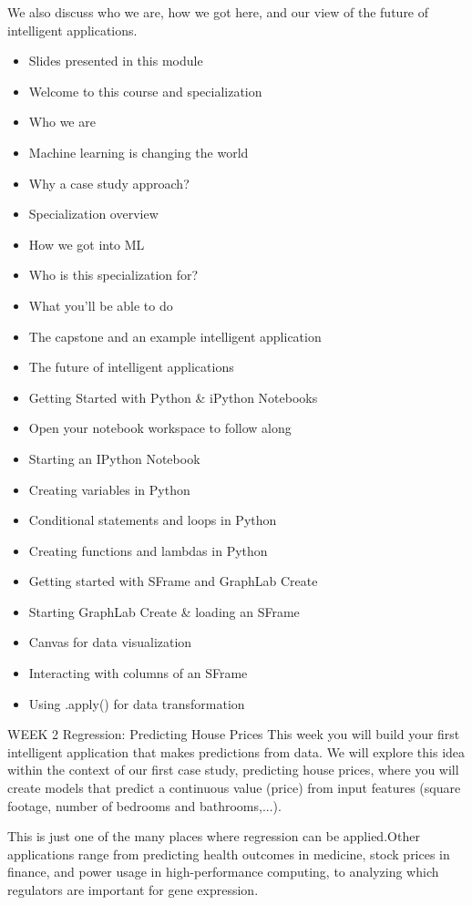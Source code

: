 We also discuss who we are, how we got here, and our view of the future of intelligent applications.
\begin{itemize}
\item Slides presented in this module
\item Welcome to this course and specialization
\item Who we are
\item Machine learning is changing the world
\item Why a case study approach?
\item Specialization overview
\item How we got into ML
\item Who is this specialization for?
\item What you'll be able to do
\item The capstone and an example intelligent application
\item The future of intelligent applications
\item Getting Started with Python & iPython Notebooks
\item Open your notebook workspace to follow along
\item Starting an IPython Notebook
\item Creating variables in Python
\item Conditional statements and loops in Python
\item Creating functions and lambdas in Python
\item Getting started with SFrame and GraphLab Create
\item Starting GraphLab Create & loading an SFrame
\item Canvas for data visualization
\item Interacting with columns of an SFrame
\item Using .apply() for data transformation
\end{itemize}
\newpage

WEEK 2
Regression: Predicting House Prices
This week you will build your first intelligent application that makes predictions from data.
We will explore this idea within the context of our first case study, predicting house prices, where you will create models that predict a continuous value (price) from input features (square footage, number of bedrooms and bathrooms,...).

This is just one of the many places where regression can be applied.Other applications range from predicting health outcomes in medicine, stock prices in finance, and power usage in high-performance computing, to analyzing which regulators are important for gene expression.

